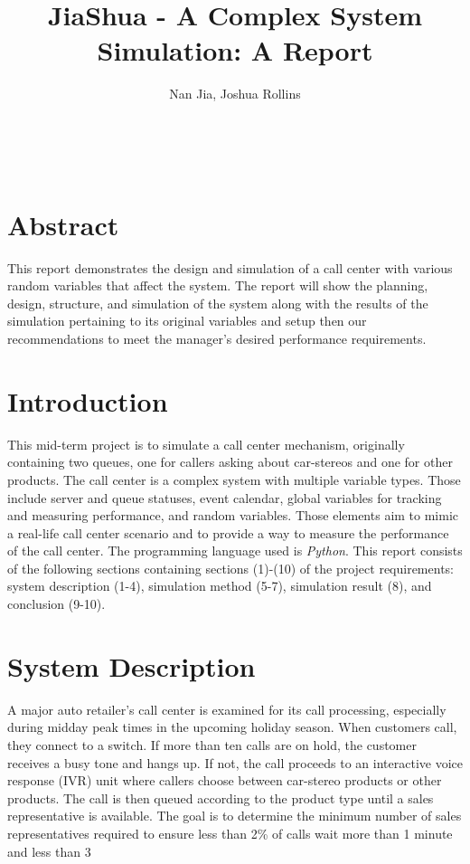 \documentclass{article}
\title{JiaShua - A Complex System Simulation: A Report}
\author{Nan Jia, Joshua Rollins}
\makeatletter
\renewcommand{\maketitle}{\bgroup\setlength{\parindent}{0pt}
\begin{flushleft}
  \textbf{\LARGE \@title} \\ %
  \vspace{0.5em}
  \@author
\end{flushleft}\egroup
}
\makeatother
\begin{document}
\maketitle
\section*{Abstract}
This report demonstrates the design and simulation of a call center with various random variables that affect the system. The report will show the planning, design, structure, and simulation of the system along with the results of the simulation pertaining to its original variables and setup then our recommendations to meet the manager’s desired performance requirements.

\section{Introduction}
This mid-term project is to simulate a call center mechanism, originally containing two queues, one for callers asking about car-stereos and one for other products. The call center is a complex system with multiple variable types. Those include server and queue statuses, event calendar, global variables for tracking and measuring performance, and random variables. Those elements aim to mimic a real-life call center scenario and to provide a way to measure the performance of the call center. The programming language used is \emph{Python}. This report consists of the following sections containing sections (1)-(10) of the project requirements: system description (1-4), simulation method (5-7), simulation result (8), and conclusion (9-10).

\section{System Description}
A major auto retailer's call center is examined for its call processing, especially during midday peak times in the upcoming holiday season. When customers call, they connect to a switch. If more than ten calls are on hold, the customer receives a busy tone and hangs up. If not, the call proceeds to an interactive voice response (IVR) unit where callers choose between car-stereo products or other products. The call is then queued according to the product type until a sales representative is available. The goal is to determine the minimum number of sales representatives required to ensure less than 2\% of calls wait more than 1 minute and less than 3%
\end{document}
